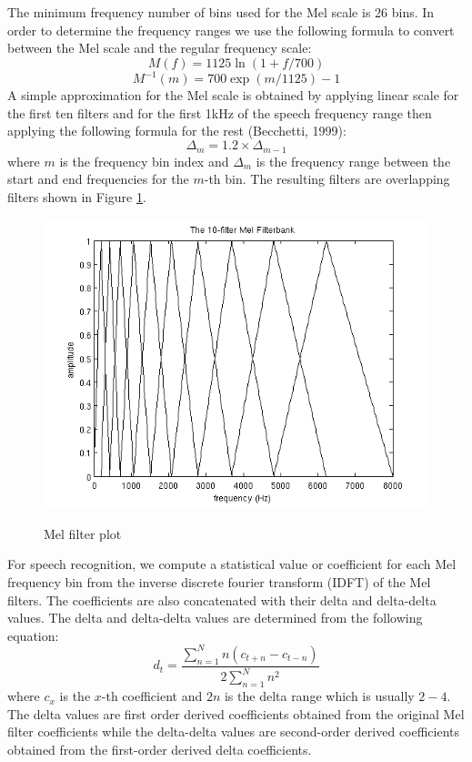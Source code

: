 The minimum frequency number of bins used for the Mel scale is 26 bins. In order to determine the frequency ranges we use the following formula to convert between the Mel scale and the regular frequency scale:
\begin{equation}
M(f)=1125\ln(1+f/700)
\label{eqn_c4_mel01}
\end{equation}
\begin{equation}
M^{−1}(m)=700\exp(m/1125)−1
\label{eqn_c4_mel02}
\end{equation}
A simple approximation for the Mel scale is obtained by applying linear scale for the first ten filters and for the first 1kHz of the speech frequency range then applying the following formula for the rest (Becchetti, 1999)\citep{becchetti1999behaviour}:
\begin{equation}
\Delta_m=1.2\times \Delta_{m-1}
\label{eqn_c4_mel03}
\end{equation}
where $m$ is the frequency bin index and  $\Delta_m$ is the frequency range between the start and end frequencies for the $m$-th bin. The resulting filters are overlapping filters shown in Figure \ref{fig_4_3_mfilt}.
\begin{figure}
\centering
  \includegraphics[width=14cm]{thesis/images/m-filters}\\
  \caption{Mel filter plot \citep{lyons_2012}}\label{fig_4_3_mfilt}
\end{figure}
For speech recognition, we compute a statistical value or coefficient for each Mel frequency bin from the inverse discrete fourier transform (IDFT) of the Mel filters.  The coefficients are also concatenated with their delta and delta-delta values.  The delta and delta-delta values are determined from the following equation:
 \begin{equation}
d_t=\frac{\sum_{n=1}^Nn(c_{t+n}−c_{t−n})}{2\sum_{n=1}^Nn^2}
\label{eqn_c4_mel04}
\end{equation}
where $c_x$ is the $x$-th coefficient and $2n$ is the delta range which is usually $2-4$. The delta values are first order derived coefficients obtained from the original Mel filter coefficients while the delta-delta values are second-order derived coefficients obtained from the first-order derived delta coefficients.

